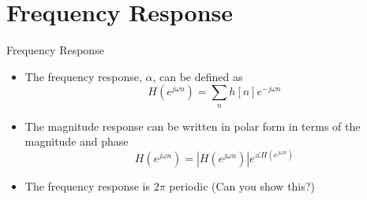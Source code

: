 \section{Frequency Response}

\begin{frame}{Frequency Response}
    \begin{itemize}
        \item The frequency response, $\alpha$, can be defined as
        \[H(e^{j\omega n}) = \sum_n h[n]e^{-j\omega n}\]
        \item The magnitude response can be written in polar form in terms of the magnitude and phase
        \[H(e^{j\omega n}) = |H(e^{j\omega n})|e^{\measuredangle H(e^{j\omega n})}\]
        \item The frequency response is $2\pi$ periodic (Can you show this?)
    \end{itemize}
\end{frame}
